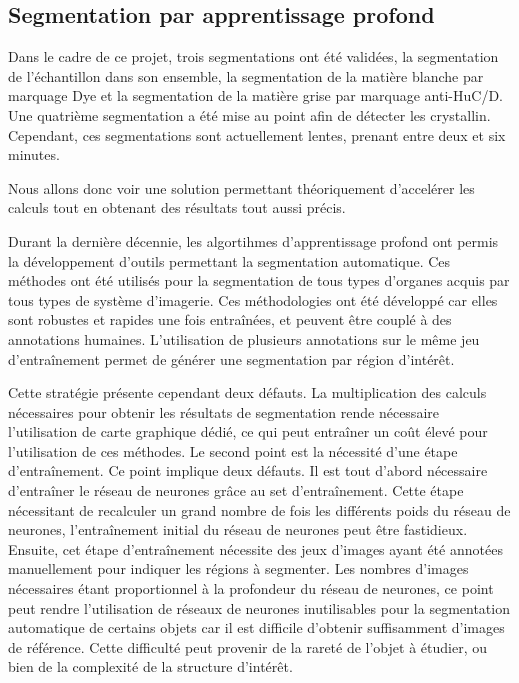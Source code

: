 \documentclass[\main/main.tex]{subfiles}
\begin{document}
    \subsection{Segmentation par apprentissage profond}

%    
Dans le cadre de ce projet,
trois segmentations ont été validées, la segmentation de l'échantillon dans son ensemble,
la segmentation de la matière blanche par marquage Dye et la segmentation de la matière grise par marquage anti-HuC/D.
%
Une quatrième segmentation a été mise au point afin de détecter les crystallin.
%
Cependant, ces segmentations sont actuellement lentes, prenant entre deux et six minutes.

Nous allons donc voir une solution permettant théoriquement d'accelérer les calculs tout en obtenant des résultats tout aussi précis.

%
Durant la dernière décennie, les algortihmes d'apprentissage profond ont permis la développement d'outils permettant la segmentation automatique\cite{long_2015,ronneberger_2015,Milletari_2016}.
%
Ces méthodes ont été utilisés pour la segmentation de tous types d'organes acquis par tous types de système d'imagerie\cite{gottapu_2018,oztel_2017,zhang_2020,hossain_2019}.
%
Ces méthodologies ont été développé car elles sont robustes et rapides une fois entraînées, et peuvent être couplé à des annotations humaines. 
%
L'utilisation de plusieurs annotations sur le même jeu d'entraînement permet de générer une segmentation par région d'intérêt\cite{zhao_2019,tong_2018,feng_2019}.

%
Cette stratégie présente cependant deux défauts.
%
La multiplication des calculs nécessaires pour obtenir les résultats de segmentation rende nécessaire l'utilisation de carte graphique dédié, ce qui peut entraîner un coût élevé pour l'utilisation de ces méthodes.
%
Le second point est la nécessité d'une étape d'entraînement.
%
Ce point implique deux défauts.
%
Il est tout d'abord nécessaire d'entraîner le réseau de neurones grâce au set d'entraînement\cite{ghafoorian_2017,jiang_2018,xu_2018}.
%
Cette étape nécessitant de recalculer un grand nombre de fois les différents poids du réseau de neurones, l'entraînement initial du réseau de neurones peut être fastidieux.
%
Ensuite, cet étape d'entraînement nécessite des jeux d'images ayant été annotées manuellement pour indiquer les régions à segmenter. 
%
Les nombres d'images nécessaires étant proportionnel à la profondeur du réseau de neurones, ce point peut rendre l'utilisation de réseaux de neurones  inutilisables pour la segmentation automatique de certains objets car il est difficile d'obtenir suffisamment d'images de référence.
%
Cette difficulté peut provenir de la rareté de l'objet à étudier, ou bien de la complexité de la structure d'intérêt.
\end{document}
